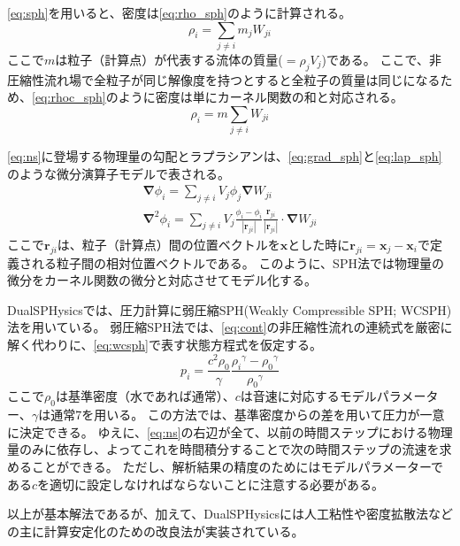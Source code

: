 		\cref{eq:sph}を用いると、密度は\cref{eq:rho_sph}のように計算される。
		\begin{equation}
			\rho_i = \sum_{j \neq i} m_j W_{ji} \label{eq:rho_sph}
		\end{equation}
		ここで$m$は粒子（計算点）が代表する流体の質量($=\rho_j V_j$)である。
		ここで、非圧縮性流れ場で全粒子が同じ解像度を持つとすると全粒子の質量は同じになるため、\cref{eq:rhoc_sph}のように密度は単にカーネル関数の和と対応される。
		\begin{equation}
			\rho_i = m \sum_{j \neq i} W_{ji} \label{eq:rhoc_sph}
		\end{equation}

		\cref{eq:ns}に登場する物理量の勾配とラプラシアンは、\cref{eq:grad_sph}と\cref{eq:lap_sph}のような微分演算子モデルで表される。
		\begin{gather}
			\mathbf{\nabla} \phi_i = \sum_{j \neq i} V_j  \phi_j \mathbf{\nabla} W_{ji} \label{eq:grad_sph} \\
			\mathbf{\nabla}^2 \phi_i = \sum_{j \neq i} V_j \frac{\phi_i - \phi_i}{\left| \mathbf{r}_{ji} \right|} \frac{\mathbf{r}_{ji}}{\left| \mathbf{r}_{ji} \right|} \cdot \mathbf{\nabla} W_{ji} \label{eq:lap_sph}
		\end{gather}
		ここで$\mathbf{r}_{ji}$は、粒子（計算点）間の位置ベクトルを$\mathbf{x}$とした時に$\mathbf{r}_{ji}=\mathbf{x}_j - \mathbf{x}_i$で定義される粒子間の相対位置ベクトルである。
		このように、SPH法では物理量の微分をカーネル関数の微分と対応させてモデル化する。

		DualSPHysicsでは、圧力計算に弱圧縮SPH(Weakly Compressible SPH; WCSPH)法\Cite{ref:wcsph}を用いている。
		弱圧縮SPH法では、\cref{eq:cont}の非圧縮性流れの連続式を厳密に解く代わりに、\cref{eq:wcsph}で表す状態方程式を仮定する。
		\begin{equation}
			p_i = \frac{c^2 \rho_0}{\gamma} \frac{{\rho_i}^\gamma - {\rho_0}^\gamma}{{\rho_0}^\gamma} \label{eq:wcsph}
		\end{equation}
		ここで$\rho_0$は基準密度（水であれば通常）、$c$は音速に対応するモデルパラメーター、$\gamma$は通常7を用いる。
		この方法では、基準密度からの差を用いて圧力が一意に決定できる。
		ゆえに、\cref{eq:ns}の右辺が全て、以前の時間ステップにおける物理量のみに依存し、よってこれを時間積分することで次の時間ステップの流速を求めることができる。
		ただし、解析結果の精度のためにはモデルパラメーターである$c$を適切に設定しなければならないことに注意する必要がある。

		以上が基本解法であるが、加えて、DualSPHysicsには人工粘性や密度拡散法などの主に計算安定化のための改良法が実装されている。

